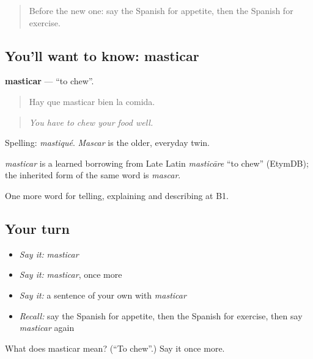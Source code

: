 \label{lesson:ES-C742-masticar}



\begin{quote}
Before the new one: say the Spanish for appetite, then the Spanish for exercise.
\end{quote}

\subsection*{You'll want to know: masticar}
\textbf{masticar} — \textquotedblleft{}to chew\textquotedblright{}.

\begin{quote}
Hay que masticar bien la comida.
\end{quote}

\begin{quote}
\emph{You have to chew your food well.}
\end{quote}

Spelling: \emph{mastiqué}. \emph{Mascar} is the older, everyday twin.

\begin{cousinweb}
\emph{masticar} is a learned borrowing from Late Latin \emph{masticāre} \textquotedblleft{}to chew\textquotedblright{} (EtymDB); the inherited form of the same word is \emph{mascar}.
\end{cousinweb}

\begin{grammarlens}[title={What you've built}]
One more word for telling, explaining and describing at B1.
\end{grammarlens}

\subsection*{Your turn}
\begin{itemize}
\raggedright
  \item \emph{Say it:} \emph{masticar}
  \item \emph{Say it:} \emph{masticar}, once more
  \item \emph{Say it:} a sentence of your own with \emph{masticar}
  \item \emph{Recall:} say the Spanish for appetite, then the Spanish for exercise, then say \emph{masticar} again
\end{itemize}

\begin{tcolorbox}[breakable,colback=teal!4,colframe=teal!35!black,title={Before you move on}]
What does masticar mean? (\textquotedblleft{}To chew\textquotedblright{}.) Say it once more.
\end{tcolorbox}
